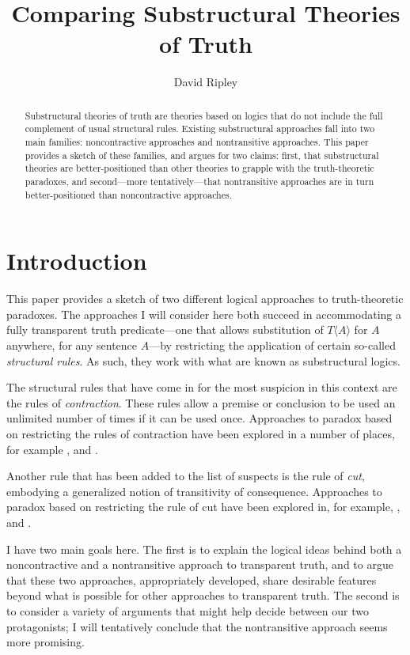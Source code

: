 \documentclass{ergoclass}
\title{Comparing Substructural \hfill{}Theories of Truth}
\author{David Ripley}
\affiliation{University of Connecticut}
\newcommand{\Tname}[1]{\T\name{#1}}
\newcommand{\name}[1]{\ensuremath{\langle #1 \rangle}}
\newcommand{\T}{\ensuremath{T}}
\renewcommand{\cite}{\citet}						%
\begin{document}
\maketitle

\begin{abstract}
Substructural theories of truth are theories based on logics that do not include the full
complement of usual structural rules. Existing substructural approaches fall into two
main families: noncontractive approaches and nontransitive approaches. This paper
provides a sketch of these families, and argues for two claims: first, that substructural
theories are better-positioned
than other theories to grapple with the truth-theoretic
paradoxes, and second---more
tentatively---that
nontransitive approaches are in turn
better-positioned
than noncontractive approaches.
\end{abstract}

\section{Introduction}

This paper provides a sketch of two different logical approaches to truth-theoretic paradoxes. The approaches I will consider here both succeed in accommodating a fully transparent truth predicate---one that allows substitution of $\Tname{A}$ for $A$ anywhere, for any sentence $A$---by restricting the application of certain so-called {\em structural rules}. As such, they work with what are known as substructural logics.

The structural rules that have come in for the most suspicion in this context are the rules of {\em contraction}. These rules allow a premise or conclusion to be used an unlimited number of times if it can be used once. Approaches to paradox based on restricting the rules of contraction have been explored in a number of places, for example \cite{bm:2curry, grishin:pstclwc, petersen:lwciua, restall:lwc, shapiro:dlc}, and \cite{zardini:twc}.

Another rule that has been added to the list of suspects is the rule of {\em cut}, embodying a generalized notion of transitivity of consequence. Approaches to paradox based on restricting the rule of cut have been explored in, for example, \citet*{cervr:rtt, ripley:pafc}, and \cite{weir:ntsl}.

I have two main goals here. The first is to explain the logical ideas behind both a noncontractive and a nontransitive approach to transparent truth, and to argue that these two approaches, appropriately developed, share desirable features beyond what is possible for other approaches to transparent truth. The second is to consider a variety of arguments that might help decide between our two protagonists; I will tentatively conclude that the nontransitive approach seems more promising.
\end{document}
